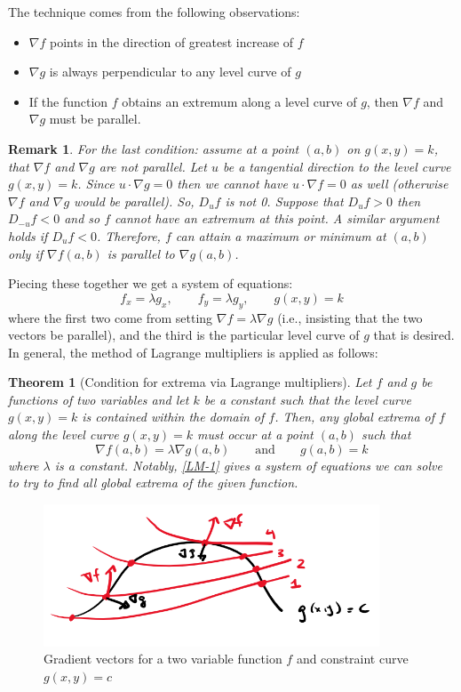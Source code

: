 \documentclass[12pt]{article}
\numberwithin{equation}{subsection}
\numberwithin{figure}{subsection}
\newtheorem{thm}[subsection]{Theorem}
\theoremstyle{note}
\newtheorem{remark}[subsection]{Remark}
\begin{document}
{The technique comes from the following observations: \begin{itemize} 
	\item $\nabla f$ points in the direction of greatest increase of $f$
	\item $\nabla g$ is always perpendicular to any level curve of $g$
	\item If the function $f$ obtains an extremum along a level curve of $g$, then $\nabla f$ and $\nabla g$ must be parallel. 
\end{itemize} 
\begin{remark}For the last condition: assume at a point $(a,b)$ on $g(x,y)=k$, that $\nabla f$ and $\nabla g$ are not parallel. Let $u$ be a tangential direction to the level curve $g(x,y)=k$. Since $u\cdot \nabla g=0$ then we cannot have $u\cdot \nabla f=0$ as well (otherwise $\nabla f$ and $\nabla g$ would be parallel). So, $D_u f$ is not 0. Suppose that $D_uf>0$ then $D_{-u}f<0$ and so $f$ cannot have an extremum at this point. A similar argument holds if $D_uf<0$. Therefore, $f$ can attain a maximum or minimum at $(a,b)$ only if $\nabla f(a,b)$ is parallel to $\nabla g(a,b)$.
\end{remark}

Piecing these together we get a system of equations:
\[
 	f_x=\lambda g_x, \qquad
	f_y=\lambda g_y, \qquad
	g(x,y)=k
\]
where the first two come from setting $\nabla f=\lambda \nabla g$ (i.e., insisting that the two vectors be parallel), and the third is the particular level curve of $g$ that is desired. In general, the method of Lagrange multipliers is applied as follows:




\begin{thm}[Condition for extrema via Lagrange multipliers] Let $f$ and $g$ be functions of two variables and let $k$ be a constant such that the level curve $g(x,y)=k$ is contained within the domain of $f$. Then, any global extrema of $f$ along the level curve $g(x,y)=k$ must occur at a point $(a,b)$ such that
\begin{equation} \label{LM-1} \nabla f(a,b)= \lambda \nabla g(a,b) \qquad \text{and} \qquad g(a,b)=k \end{equation}
where $\lambda$ is a constant. Notably, \eqref{LM-1} gives a system of equations we can solve to try to find all global extrema of the given function. 
\end{thm}
\begin{figure}[h!]
\centering
\includegraphics[width=100mm]{Images/LM}
\caption{Gradient vectors for a two variable function $f$ and constraint curve $g(x,y)=c$}
\label{fig-LM}
\end{figure}

}
\end{document}
